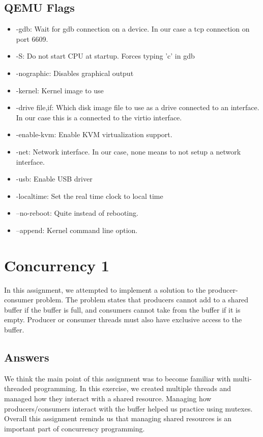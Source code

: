 \documentclass[journal, letterpaper, draftclsnofoot, onecolumn, 10pt]{IEEEtran}
\begin{document}
\subsection{QEMU Flags}
\begin{itemize}
  \item -gdb: Wait for gdb connection on a device. In our case a tcp connection on port 6609.
  \item -S: Do not start CPU at startup. Forces typing 'c' in gdb
  \item -nographic: Disables graphical output
  \item -kernel: Kernel image to use
  \item -drive file,if: Which disk image file to use as a drive connected to an interface. In our case this is a connected to the virtio interface.
  \item -enable-kvm: Enable KVM virtualization support.
  \item -net: Network interface. In our case, none means to not setup a network interface.
  \item -usb: Enable USB driver
  \item -localtime: Set the real time clock to local time
  \item --no-reboot: Quite instead of rebooting.
  \item --append: Kernel command line option.
\end{itemize}
\section{Concurrency 1}
In this assignment, we attempted to implement a solution to the producer-consumer problem. The problem states that producers cannot
add to a shared buffer if the buffer is full, and consumers cannot take from the buffer if it is empty. Producer or consumer threads
must also have exclusive access to the buffer.

\subsection{Answers}
We think the main point of this assignment was to become familiar with multi-threaded programming. In this exercise, we
created multiple threads and managed how they interact with a shared resource. Managing how producers/consumers interact
with the buffer helped us practice using mutexes. Overall this assignment reminds us that managing shared resources is an
important part of concurrency programming.
\end{document}
